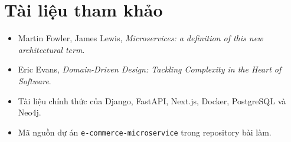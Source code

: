 \documentclass[12pt,a4paper]{article}
\begin{document}
\section*{Tài liệu tham khảo}
\begin{itemize}
  \item Martin Fowler, James Lewis, \textit{Microservices: a definition of this new architectural term}.
  \item Eric Evans, \textit{Domain-Driven Design: Tackling Complexity in the Heart of Software}.
  \item Tài liệu chính thức của Django, FastAPI, Next.js, Docker, PostgreSQL và Neo4j.
  \item Mã nguồn dự án \texttt{e-commerce-microservice} trong repository bài làm.
\end{itemize}
\end{document}
